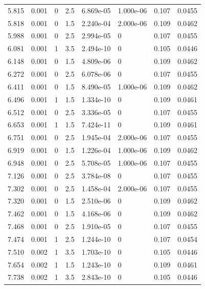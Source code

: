 \documentclass[preview]{standalone}
\begin{document}
{{{\begin{tabular}{L{1.2cm}C{1.2cm} C{0.3cm}C{0.5cm} C{1.4cm}C{1.4cm} C{1.4cm}C{1.4cm}}
  5.815  &  0.001  & 0     & 2.5 &  6.869e-05  & 1.000e-06  & 0.107 &  0.0455   \\ 
  5.818  &  0.001  & 0     & 1.5 &  2.240e-04  & 2.000e-06  & 0.109 &  0.0462   \\ 
  5.988  &  0.001  & 0     & 2.5 &  2.994e-05  & 0  & 0.107 &  0.0455   \\ 
  6.081  &  0.001  & 1     & 3.5 &  2.494e-10  & 0  & 0.105 &  0.0446   \\ 
  6.148  &  0.001  & 0     & 1.5 &  4.809e-06  & 0  & 0.109 &  0.0462   \\ 
  6.272  &  0.001  & 0     & 2.5 &  6.078e-06  & 0  & 0.107 &  0.0455   \\ 
  6.411  &  0.001  & 0     & 1.5 &  8.490e-05  & 1.000e-06  & 0.109 &  0.0462   \\ 
  6.496  &  0.001  & 1     & 1.5 &  1.334e-10  & 0  & 0.109 &  0.0461   \\ 
  6.512  &  0.001  & 0     & 2.5 &  3.336e-05  & 0  & 0.107 &  0.0455   \\ 
  6.653  &  0.001  & 1     & 1.5 &  7.424e-11  & 0  & 0.109 &  0.0461   \\ 
  6.751  &  0.001  & 0     & 2.5 &  1.945e-04  & 2.000e-06  & 0.107 &  0.0455   \\ 
  6.919  &  0.001  & 0     & 1.5 &  1.226e-04  & 1.000e-06  & 0.109 &  0.0462   \\ 
  6.948  &  0.001  & 0     & 2.5 &  5.708e-05  & 1.000e-06  & 0.107 &  0.0455   \\ 
  7.126  &  0.001  & 0     & 2.5 &  3.784e-08  & 0  & 0.107 &  0.0455   \\ 
  7.302  &  0.001  & 0     & 2.5 &  1.458e-04  & 2.000e-06  & 0.107 &  0.0455   \\ 
  7.320  &  0.001  & 0     & 1.5 &  2.510e-06  & 0  & 0.109 &  0.0462   \\ 
  7.462  &  0.001  & 0     & 1.5 &  4.168e-06  & 0  & 0.109 &  0.0462   \\ 
  7.468  &  0.001  & 0     & 2.5 &  1.910e-05  & 0  & 0.107 &  0.0455   \\ 
  7.474  &  0.001  & 1     & 2.5 &  1.244e-10  & 0  & 0.107 &  0.0454   \\ 
  7.510  &  0.002  & 1     & 3.5 &  1.703e-10  & 0  & 0.105 &  0.0446   \\ 
  7.654  &  0.002  & 1     & 1.5 &  1.243e-10  & 0  & 0.109 &  0.0461   \\ 
  7.738  &  0.002  & 1     & 3.5 &  2.843e-10  & 0  & 0.105 &  0.0446   \\ 

\end{tabular}}}}
\end{document}
